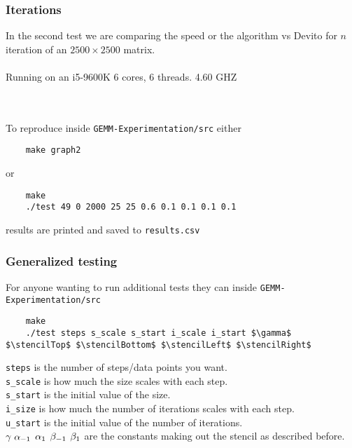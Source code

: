\documentclass{article}
\begin{document}
\subsubsection*{Iterations}
In the second test we are comparing the speed or the algorithm vs Devito for $n$ iteration of an $2500 \times 2500$ matrix. \\\\              
Running on an i5-9600K 6 cores, 6 threads. 4.60 GHZ \\ \\
 \\
To reproduce inside \texttt{GEMM-Experimentation/src} either 
\begin{lstlisting}
	make graph2
\end{lstlisting} or 
\begin{lstlisting}
	make
	./test 49 0 2000 25 25 0.6 0.1 0.1 0.1 0.1
\end{lstlisting}
results are printed and saved to \texttt{results.csv}
\subsubsection*{Generalized testing}
For anyone wanting to run additional tests they can inside \texttt{GEMM-Experimentation/src} 
\begin{lstlisting}
	make
	./test steps s_scale s_start i_scale i_start $\gamma$ $\stencilTop$ $\stencilBottom$ $\stencilLeft$ $\stencilRight$ 
\end{lstlisting}
\texttt{steps} is the number of steps/data points you want. \\
\texttt{s\_scale} is how much the size scales with each step. \\
\texttt{s\_start} is the initial value of the size. \\
\texttt{i\_size} is how much the number of iterations scales with each step. \\
\texttt{u\_start} is the initial value of the number of iterations. \\
$\gamma$ $\alpha_{-1}$ $\alpha_{1}$ $\beta_{-1}$ $\beta_{1}$ are the constants making out the stencil as described before.
\end{document}
